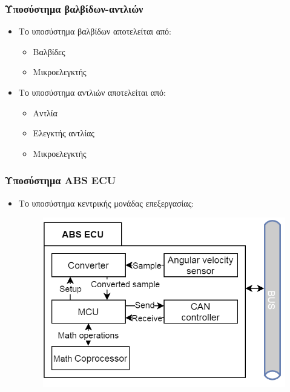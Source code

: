 \documentclass[fleqn]{beamer}
\begin{document}
\begin{frame}
  \frametitle{Υποσύστημα βαλβίδων-αντλιών}
  \begin{itemize}
    \item Το υποσύστημα βαλβίδων αποτελείται από:
      \begin{itemize}
        \item Βαλβίδες
        \item Μικροελεγκτής
      \end{itemize}
        \item Το υποσύστημα αντλιών αποτελείται από:
      \begin{itemize}
        \item Αντλία
        \item Ελεγκτής αντλίας
        \item Μικροελεγκτής
      \end{itemize}
  \end{itemize}
\end{frame}

\begin{frame}
  \frametitle{Υποσύστημα ABS ECU}
  \begin{itemize}
        \item Το υποσύστημα κεντρικής μονάδας επεξεργασίας:
\begin{figure}[H]
    \begin{center}
    \includegraphics[scale=0.27]{images/central-abs-ecu-module-design.png}
    \end{center}
\end{figure}
  \end{itemize}

\end{frame}
\end{document}
